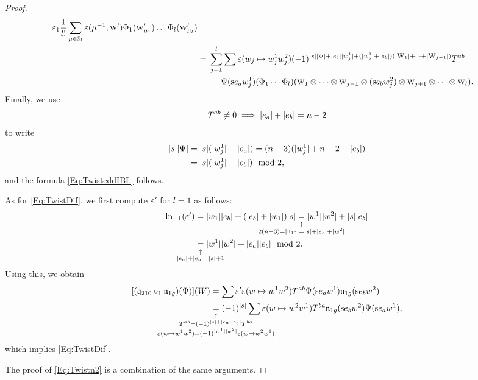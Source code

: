 \documentclass[\MainFolder/Text.tex]{subfiles}
\begin{document}
\begin{proof}
$$\begin{aligned}
\begin{multlined}[t]
\varepsilon_1 \frac{1}{l!}\sum_{\mu \in \Perm_l} \varepsilon(\mu^{-1}, \W')\Phi_1(\W'_{\mu_1}) \dots \Phi_l(\W'_{\mu_l}) \end{multlined} \\
 & = \begin{multlined}[t]\sum_{j=1}^l \sum \varepsilon(w_j \mapsto w_j^1 w_j^2) (-1)^{\Abs{s}\Abs{\Psi} + \Abs{e_b}\Abs{w_j^1} + (\Abs{w_j^1} + \Abs{e_b})(\Abs{\W_1}+ \dotsb + \Abs{\W_{j-1}}) }T^{ab} \\ 
 \Psi(\Susp e_a w_j^1) (\Phi_1 \dotsb \Phi_l)(\W_1 \otimes \dotsb \otimes \W_{j-1} \otimes (\Susp e_b w_j^2) \otimes \W_{j+1} \otimes \dotsb \otimes \W_l). \end{multlined}
\end{aligned}$$
Finally, we use
$$ T^{ab} \neq 0\; \Longrightarrow\; |e_a| + |e_b| = n-2 $$
to write
$$\begin{aligned}
|s||\Psi| &= |s|(|w_{j}^1| + |e_a|) = (n-3)(|w_{j}^1| + n-2 - |e_b|) \\ 
&= |s|(|w_{j}^1| + |e_b|) \mod 2, \end{aligned}$$
and the formula \eqref{Eq:TwisteddIBL} follows.

As for \eqref{Eq:TwistDif}, we first compute $\varepsilon'$ for $l=1$ as follows:
$$ \begin{aligned}\ln_{-1}(\varepsilon')  &= \Abs{w_1} \Abs{e_b} + (\Abs{e_b} + \Abs{w_1})\Abs{s}  \underset{\mathclap{\substack{\uparrow\rule{0pt}{1.5ex} \\2(n-3) = \Abs{\PMC_{10}} = \Abs{s} + \Abs{e_b} + \Abs{w^2}}}}{=} \Abs{w^1}\Abs{w^2} + \Abs{s}\Abs{e_b} \\ &\underset{\mathclap{\substack{\uparrow\rule{0pt}{1.5ex} \\ \Abs{e_a} + \Abs{e_b} = \Abs{s} + 1}}}{=} \Abs{w^1}\Abs{w^2} + \Abs{e_a}\Abs{e_b} \mod 2.  \end{aligned}$$
Using this, we obtain
$$ \begin{aligned}
[(\OPQ_{210}\circ_1 \PMC_{1g})(\Psi)](W) &= \sum \varepsilon' \varepsilon(w\mapsto w^1 w^2) T^{ab} \Psi(\Susp e_a w^1) \PMC_{1g}(\Susp e_b w^2) \\
&\underset{\mathclap{\substack{\uparrow\rule{0pt}{1.5ex} \\ T^{ab} = (-1)^{\Abs{s} + \Abs{e_a}\Abs{e_b}} T^{ba} \\
\varepsilon(w\mapsto w^1 w^2) =  (-1)^{\Abs{w^1} \Abs{w^2}} \varepsilon(w\mapsto w^2 w^1)}}}{=} (-1)^{\Abs{s}} \sum \varepsilon(w\mapsto w^2 w^1) T^{ba} \PMC_{1g}(\Susp e_b w^2) \Psi(\Susp e_a w^1),
\end{aligned}$$
which implies \eqref{Eq:TwistDif}.

The proof of \eqref{Eq:Twistn2} is a combination of the same arguments.
\end{proof}
\end{document}
